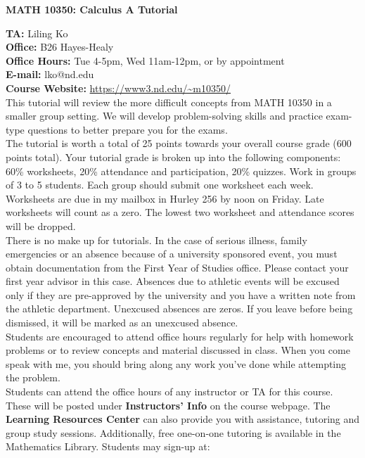 \documentclass{article}[12pt]
\begin{document}
\begin{center}{\bf MATH 10350: Calculus A Tutorial} \end{center}
{\bf TA:} Liling Ko\\
{\bf Office:} B26 Hayes-Healy\\
{\bf Office Hours:} Tue 4-5pm, Wed 11am-12pm, or by appointment\\
{\bf E-mail:} lko@nd.edu\\
{\bf Course Website:} \url{https://www3.nd.edu/~m10350/}\\

 This tutorial will review the more difficult
concepts from MATH 10350 in a smaller group setting. We will develop
problem-solving skills and practice exam-type questions to better prepare
you for the exams.\\

 The tutorial is worth a total of 25 points
towards your overall course grade (600 points total). Your tutorial grade
is broken up into the following components: 60\% worksheets, 20\%
attendance and participation, 20\% quizzes. Work in groups of 3 to 5
students. Each group should submit one worksheet each week. Worksheets are
due in my mailbox in Hurley 256 by noon on Friday. Late worksheets will
count as a zero. The lowest two worksheet and attendance scores will be
dropped. \\

 There is no make up for tutorials. In the case
of serious illness, family emergencies or an absence because of a
university sponsored event, you must obtain documentation from the First
Year of Studies office. Please contact your first year advisor in this
case. Absences due to athletic events will be excused only if they are
pre-approved by the university and you have a written note from the
athletic department. Unexcused absences are zeros. If you leave before
being dismissed, it will be marked as an unexcused absence. \\

 Students are encouraged to attend office
hours regularly for help with homework problems or to review concepts and
material discussed in class. When you come speak with me, you should bring
along any work you've done while attempting the problem.\\

 Students can attend the office hours of any
instructor or TA for this course. These will be posted under {\bf
Instructors' Info} on the course webpage. The {\bf Learning Resources
Center} can also provide you with assistance, tutoring and group study
sessions. Additionally, free one-on-one tutoring is available in the
Mathematics Library. Students may sign-up at:
\end{document}

